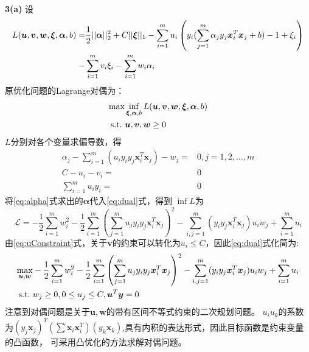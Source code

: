 \documentclass{article}
\begin{document}
\textbf{3(a)}
设
\begin{align}\notag
L(\bm{u},\bm{v},\bm{w},\bm{\xi},\bm{\alpha},b)=&
\frac{1}{2}||\bm{\alpha}||_2^2+C ||\bm{\xi}||_1-\sum_{i=1}^m u_i
\left(y_i(\sum_{j=1}^m \alpha_j y_j \bm{x}_i^T\bm{x}_j +b)-1+\xi_i\right) \\
-&\sum_{i=1}^m v_i \xi_i -\sum_{i=1}^m w_i\alpha_i
\end{align}
原优化问题的Lagrange对偶为：
\begin{align}\notag
\max & \inf_{\bm{\xi},\bm{\alpha},b}{L(\bm{u},\bm{v},\bm{w},\bm{\xi},\bm{\alpha},b)}\\
\text{s.t.}\,\, & \bm{u},\bm{v},\bm{w}\geq 0\label{eq:dual}
\end{align}
$L$分别对各个变量求偏导数，得
\begin{align}
\alpha_j-\sum_{i=1}^m (u_i y_iy_j \bm{x}_i^T\bm{x}_j)-w_j=&0,j=1,2,\dots,m\label{eq:alpha}\\
C-u_i-v_i =& 0 \label{eq:uConstraint}\\
\sum_{i=1}^m u_i y_i =&0
\end{align}
将\eqref{eq:alpha}式求出的$\bm{\alpha}$代入\eqref{eq:dual}式，得到
$\inf L$为
\begin{equation}
\mathcal{L}=-\frac{1}{2}\sum_{i=1}^m w_i^2 -\frac{1}{2}\sum_{i=1}^m\left(\sum_{j=1}^m u_j y_iy_j \bm{x}_i^T\bm{x}_j\right)^2
-\sum_{i,j=1}^m (y_i y_j \bm{x}_i^T\bm{x}_j) u_i w_j+\sum_{i=1}^m u_i
\end{equation}
由\eqref{eq:uConstraint}式，关于$\bm{v}$的约束可以转化为$u_i\leq C$，因此\eqref{eq:dual}式化简为:
\begin{align}\notag
\max_{\bm{u},\bm{w}} & -\frac{1}{2} \sum_{i=1}^m w_i^2 -\frac{1}{2}\sum_{i=1}^m\left(\sum_{j=1}^m u_j y_iy_j \bm{x}_i^T\bm{x}_j\right)^2
-\sum_{i,j=1}^m (y_i y_j \bm{x}_i^T\bm{x}_j) u_i w_j+\sum_{i=1}^m u_i\\
\text{s.t.}\,\, & w_j\geq 0, 0\leq u_j \leq C, \bm{u}^T\bm{y}=0
\end{align}
注意到对偶问题是关于$\bm{u},\bm{w}$的带有区间不等式约束的二次规划问题。
$u_iu_k$的系数为$(y_j \bm{x}_j)^T(\sum \bm{x}_i\bm{x}_i^T) (y_k \bm{x}_k)$,具有内积的表达形式，因此目标函数是约束变量的凸函数，
可采用凸优化的方法求解对偶问题。
\end{document}
